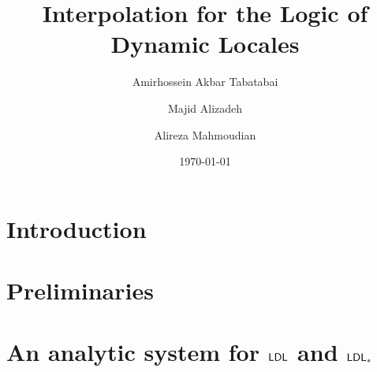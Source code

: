 \documentclass[10pt,a4paper]{amsart}
\begin{document}
\title{Interpolation for the Logic of Dynamic Locales}
\author{Amirhossein Akbar Tabatabai}


\author{Majid Alizadeh}

\author{Alireza Mahmoudian}

\date{\today}
 
\begin{abstract}
	
\end{abstract}

\maketitle



\section{Introduction}


\section{Preliminaries}


\section{An analytic system for $\mathsf{LDL}$ and $\mathsf{LDL}_*$}




\end{document}

